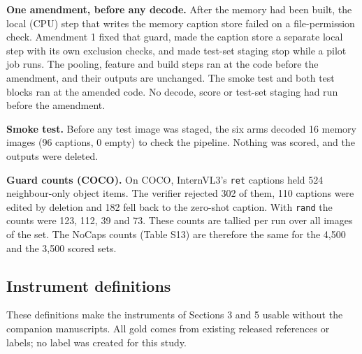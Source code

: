 \documentclass[manuscript,screen]{acmart}
\begin{document}
\textbf{One amendment, before any decode.} After the memory had been built, the local (CPU) step
that writes the memory caption store failed on a file-permission check. Amendment 1 fixed that
guard, made the caption store a separate local step with its own exclusion checks, and made test-set
staging stop while a pilot job runs. The pooling, feature and build steps ran at the code before the
amendment, and their outputs are unchanged. The smoke test and both test blocks ran at the amended
code. No decode, score or test-set staging had run before the amendment.

\textbf{Smoke test.} Before any test image was staged, the six arms decoded 16 memory images (96
captions, 0 empty) to check the pipeline. Nothing was scored, and the outputs were deleted.

\textbf{Guard counts (COCO).} On COCO, InternVL3's \texttt{ret} captions held 524 neighbour-only
object items. The verifier rejected 302 of them, 110 captions were edited by deletion and 182 fell
back to the zero-shot caption. With \texttt{rand} the counts were 123, 112, 39 and 73. These counts
are tallied per run over all images of the set. The NoCaps counts (Table S13) are therefore the same
for the 4,500 and the 3,500 scored sets.

\subsection{Instrument definitions}\label{instrument-definitions}

These definitions make the instruments of Sections 3 and 5 usable without the companion manuscripts.
All gold comes from existing released references or labels; no label was created for this study.
\end{document}

